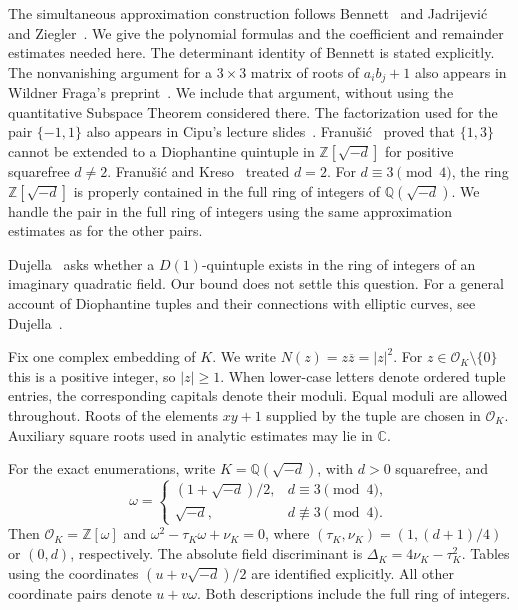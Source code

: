 \documentclass[12pt]{article}
\numberwithin{equation}{section}
\begin{document}
The simultaneous approximation construction follows Bennett~\cite{Bennett96}
and Jadrijevi\'c and Ziegler~\cite{JZ}. We give the polynomial formulas and
the coefficient and remainder estimates needed here. The determinant
identity of Bennett is stated explicitly. The nonvanishing argument for
a $3\times3$ matrix of roots of $a_i b_j+1$ also appears in
Wildner Fraga's preprint~\cite[Lemma~3.1]{W}. We include that argument, without using
the quantitative Subspace Theorem considered there. The factorization
used for the pair $\{-1,1\}$ also appears in Cipu's lecture
slides~\cite[pp.~27--30]{Cipu25}. Franu\v{s}i\'c~\cite[Theorem~1]{F10} proved that
$\{1,3\}$ cannot be extended to a Diophantine quintuple in
$\mathbb Z[\sqrt{-d}]$ for positive squarefree $d\ne2$.
Franu\v{s}i\'c and Kreso~\cite[Corollary~1.2]{FK11} treated $d=2$.
For $d\equiv3\pmod4$, the ring $\mathbb Z[\sqrt{-d}]$ is properly contained
in the full ring of integers of $\mathbb Q(\sqrt{-d})$. We handle the pair in the full ring of integers using
the same approximation estimates as for the other pairs.

Dujella~\cite[Problem~1.11]{DujellaOpen} asks whether a $D(1)$-quintuple
exists in the ring of integers of an imaginary quadratic field.
Our bound does not settle this question.
For a general account of Diophantine tuples and their connections with
elliptic curves, see Dujella~\cite{Dujella24}.

Fix one complex embedding of $K$. We write $N(z)=z\overline z=|z|^2$.
For $z\in\mathcal O_K\setminus\{0\}$ this is a positive integer, so
$|z|\ge1$. When lower-case letters denote ordered tuple entries,
the corresponding capitals denote their moduli. Equal moduli are allowed throughout. Roots of the elements $xy+1$
supplied by the tuple are chosen in $\mathcal O_K$. Auxiliary square
roots used in analytic estimates may lie in $\mathbb C$.

For the exact enumerations, write $K=\mathbb Q(\sqrt{-d})$, with
$d>0$ squarefree, and
\[
 \omega=\begin{cases}(1+\sqrt{-d})/2,&d\equiv3\pmod4,\\
                     \sqrt{-d},&d\not\equiv3\pmod4.
       \end{cases}
\]
Then $\mathcal O_K=\mathbb Z[\omega]$ and
$\omega^2-\tau_K\omega+\nu_K=0$, where
$(\tau_K,\nu_K)=(1,(d+1)/4)$ or $(0,d)$, respectively.
The absolute field discriminant is $\Delta_K=4\nu_K-\tau_K^2$.
Tables using the coordinates $(u+v\sqrt{-d})/2$ are identified explicitly.
All other coordinate pairs denote $u+v\omega$. Both descriptions include
the full ring of integers.
\end{document}
